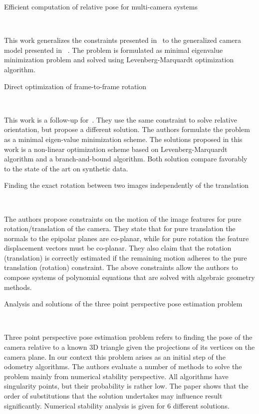 \documentclass[10pt]{article}         %
\begin{document}
\begin{enumerate}
  {\Large \item Efficient computation of relative pose for multi-camera systems}~\cite{kneip2014efficient}

  This work generalizes the constraints presented
  in~\cite{kneip2012finding} to the generalized camera model presented
  in ~\cite{pless2003using}.  The problem is formulated as minimal
  eigenvalue minimization problem and solved using Levenberg-Marquardt
  optimization algorithm.


  {\Large \item Direct optimization of frame-to-frame
    rotation}~\cite{kneip2013direct}

  This work is a follow-up for~\cite{kneip2012finding}.  They use the
  same constraint to solve relative orientation, but propose a
  different solution. The authors formulate the problem as a minimal
  eigen-value minimization scheme. The solutions proposed in this work
  is a non-linear optimization scheme based on Levenberg-Marquardt
  algorithm and a branch-and-bound algorithm.  Both solution compare
  favorably to the state of the art on synthetic data.

  {\Large \item Finding the exact rotation between two images
    independently of the translation}~\cite{kneip2012finding}
  
  The authors propose constraints on the motion of the image features
  for pure rotation/translation of the camera.  They state that for
  pure translation the normals to the epipolar planes are co-planar,
  while for pure rotation the feature displacement vectors must be
  co-planar.  They also claim that the rotation (translation) is
  correctly estimated if the remaining motion adheres to the pure
  translation (rotation) constraint.  The above constraints allow the
  authors to compose systems of polynomial equations that are solved
  with algebraic geometry methods.
  
  {\Large \item Analysis and solutions of the three point perspective pose estimation problem}~\cite{haralick1991analysis}

  Three point perspective pose estimation problem refers to finding
  the pose of the camera relative to a known 3D triangle given the
  projections of its vertices on the camera plane.  In our context
  this problem arises as an initial step of the odometry algorithms.
  The authors evaluate a number of methods to solve the problem mainly
  from numerical stability perspective.  All algorithms have
  singularity points, but their probability is rather low. The paper
  shows that the order of substitutions that the solution undertakes
  may influence result significantly.  Numerical stability analysis is
  given for 6 different solutions.


\end{enumerate}
\end{document}

